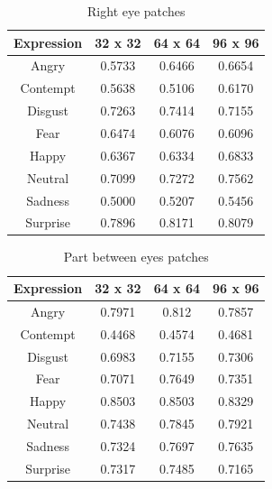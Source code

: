 \begin{table}
\caption{Right eye patches}
\label{table:right_eye}

\begin{tabular}{| c | c | c | c |}
\hline
Expression & 32 x 32 &  64 x 64  & 96 x 96  \\

\hline
Angry    & 0.5733 & 0.6466 & 0.6654 \\
Contempt & 0.5638 & 0.5106 & 0.6170 \\ 
Disgust	 & 0.7263 & 0.7414 & 0.7155 \\
Fear	 & 0.6474 & 0.6076 & 0.6096 \\
Happy	 & 0.6367 & 0.6334 & 0.6833 \\
Neutral  & 0.7099 & 0.7272 & 0.7562 \\
Sadness  & 0.5000 & 0.5207 & 0.5456 \\
Surprise & 0.7896 & 0.8171 & 0.8079 \\

\hline
\end{tabular}
\end{table}

\begin{table}
\caption{Part between eyes patches}
\label{table:between_eyes}

\begin{tabular}{| c | c | c | c |}
\hline
Expression & 32 x 32 &  64 x 64  & 96 x 96  \\

\hline
Angry & 0.7971 & 0.812 & 0.7857 \\
Contempt & 0.4468 & 0.4574 & 0.4681 \\
Disgust & 0.6983 & 0.7155 & 0.7306 \\
Fear & 0.7071 & 0.7649 & 0.7351 \\
Happy & 0.8503 & 0.8503 & 0.8329 \\
Neutral & 0.7438 & 0.7845 & 0.7921 \\
Sadness & 0.7324 & 0.7697 & 0.7635 \\
Surprise & 0.7317 & 0.7485 & 0.7165 \\

\hline
\end{tabular}
\end{table}


